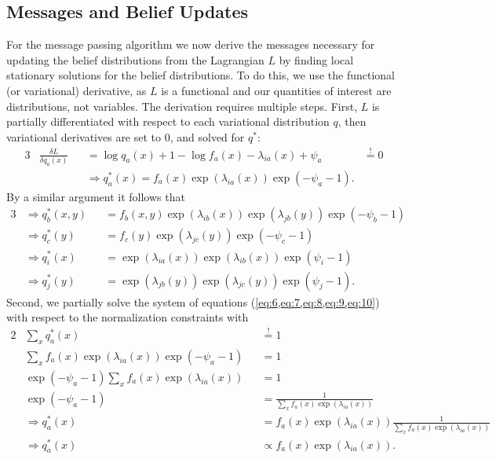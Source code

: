 \subsection{Messages and Belief Updates}
For the message passing algorithm we now derive the messages necessary for updating the belief distributions from the Lagrangian \(L\) by finding local stationary solutions for the belief distributions. To do this, we use the functional (or variational) derivative, as \(L\) is a functional and our quantities of interest are distributions, not variables. The derivation requires multiple steps. First, \(L\) is partially differentiated with respect to each variational distribution \(q\), then variational derivatives are set to \(0\), and solved for \(q^*\):
\begin{alignat}{3}
     & \frac{\delta L}{\delta q_a(x)} &  & = \log q_a(x) + 1 - \log f_a(x) - \lambda_{ia}(x) + \psi_a             & \overset{!}{=} 0 \\
     &                                &  & \Rightarrow q_a^*(x) = f_a(x) \exp(\lambda_{ia}(x)) \exp(-\psi_a - 1). & \label{eq:6}
\end{alignat}
By a similar argument it follows that
\begin{alignat}{3}
     & \Rightarrow q_b^*(x,y) &  & = f_b(x,y) \exp(\lambda_{ib}(x)) \exp(\lambda_{jb}(y)) \exp(-\psi_b - 1)                & \label{eq:7} \\
     & \Rightarrow q_c^*(y)   &  & = f_c(y) \exp(\lambda_{jc}(y)) \exp(-\psi_c - 1)                           \label{eq:8}                \\
     & \Rightarrow q_i^*(x)   &  & = \exp(\lambda_{ia}(x)) \exp(\lambda_{ib}(x)) \exp(\psi_i - 1)             \label{eq:9}                \\
     & \Rightarrow q_j^*(y)   &  & = \exp(\lambda_{jb}(y)) \exp(\lambda_{jc}(y)) \exp(\psi_j - 1).\label{eq:10}
\end{alignat}
Second, we partially solve the system of equations (\cref{eq:6,eq:7,eq:8,eq:9,eq:10}) with respect to the normalization constraints with
\begin{alignat}{2}
     & \sum_x q_a^*(x)                                       &  & \overset{!}{=} 1                                                             \\
     & \sum_x f_a(x) \exp(\lambda_{ia}(x)) \exp(-\psi_a - 1) &  & = 1                                                                          \\
     & \exp(-\psi_a - 1) \sum_x f_a(x) \exp(\lambda_{ia}(x)) &  & = 1                                                                          \\
     & \exp(-\psi_a - 1)                                     &  & = \frac{1}{\sum_x f_a(x) \exp(\lambda_{ia}(x))}                              \\
     & \Rightarrow q_a^*(x)                                  &  & = f_a(x) \exp(\lambda_{ia}(x)) \frac{1}{\sum_x f_a(x) \exp(\lambda_{ia}(x))} \\
     & \Rightarrow q_a^*(x)                                  &  & \propto f_a(x) \exp(\lambda_{ia}(x)). \label{eq:1}
\end{alignat}
